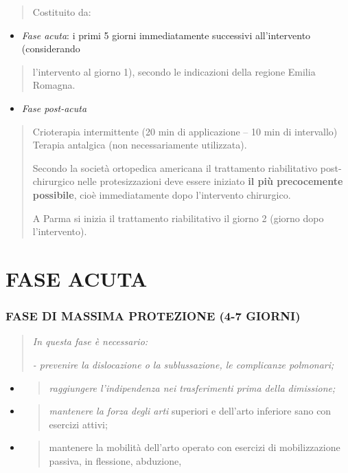 \documentclass[]{article}
\begin{document}
\begin{quote}
Costituito da:
\end{quote}

\begin{itemize}
\item
  \emph{Fase acuta}: i primi 5 giorni immediatamente successivi
  all'intervento (considerando
\end{itemize}

\begin{quote}
l'intervento al giorno 1), secondo le indicazioni della regione Emilia
Romagna.
\end{quote}

\begin{itemize}
\item
  \emph{Fase post-acuta}
\end{itemize}

\begin{quote}
Crioterapia intermittente (20 min di applicazione -- 10 min di
intervallo) Terapia antalgica (non necessariamente utilizzata).

Secondo la società ortopedica americana il trattamento riabilitativo
post-chirurgico nelle protesizzazioni deve essere iniziato \textbf{il
più precocemente possibile}, cioè immediatamente dopo l'intervento
chirurgico.

A Parma si inizia il trattamento riabilitativo il giorno 2 (giorno dopo
l'intervento).
\end{quote}

\section{FASE ACUTA}\label{fase-acuta}

\subsubsection{FASE DI MASSIMA PROTEZIONE (4-7
GIORNI)}\label{fase-di-massima-protezione-4-7-giorni}

\begin{quote}
\emph{In questa fase è necessario:}

\emph{- prevenire la dislocazione o la sublussazione, le complicanze
polmonari;}
\end{quote}

\begin{itemize}
\item
  \begin{quote}
  \emph{raggiungere l'indipendenza nei trasferimenti prima della
  dimissione;}
  \end{quote}
\item
  \begin{quote}
  \emph{mantenere la forza degli arti} superiori e dell'arto inferiore
  sano con esercizi attivi;
  \end{quote}
\item
  \begin{quote}
  mantenere la mobilità dell'arto operato con esercizi di mobilizzazione
  passiva, in flessione, abduzione,
  \end{quote}
\end{itemize}
\end{document}
